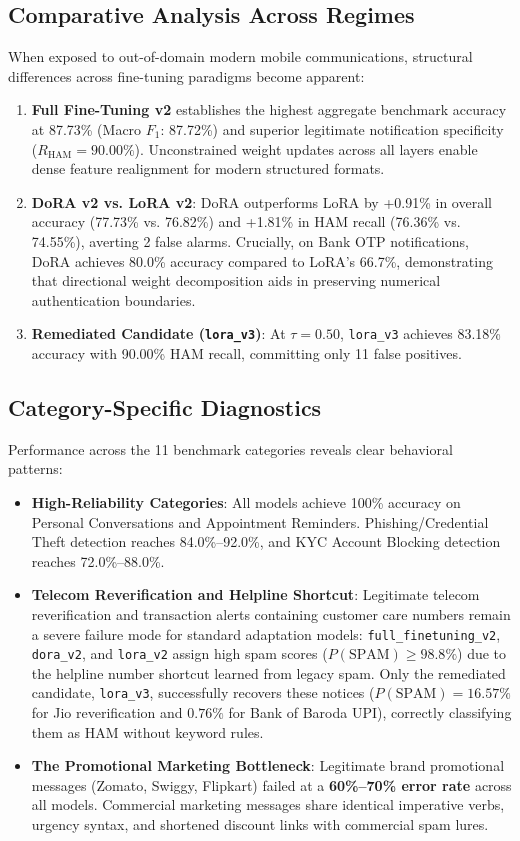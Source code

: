 \documentclass[conference]{IEEEtran}
\begin{document}
\subsection{Comparative Analysis Across Regimes}
When exposed to out-of-domain modern mobile communications, structural differences across fine-tuning paradigms become apparent:
\begin{enumerate}
    \item \textbf{Full Fine-Tuning v2} establishes the highest aggregate benchmark accuracy at 87.73\% (Macro $F_1$: 87.72\%) and superior legitimate notification specificity ($R_{\text{HAM}} = 90.00\%$). Unconstrained weight updates across all layers enable dense feature realignment for modern structured formats.
    \item \textbf{DoRA v2 vs. LoRA v2}: DoRA outperforms LoRA by +0.91\% in overall accuracy (77.73\% vs. 76.82\%) and +1.81\% in HAM recall (76.36\% vs. 74.55\%), averting 2 false alarms. Crucially, on Bank OTP notifications, DoRA achieves 80.0\% accuracy compared to LoRA's 66.7\%, demonstrating that directional weight decomposition aids in preserving numerical authentication boundaries.
    \item \textbf{Remediated Candidate (\texttt{lora\_v3})}: At $\tau = 0.50$, \texttt{lora\_v3} achieves 83.18\% accuracy with 90.00\% HAM recall, committing only 11 false positives.
\end{enumerate}

\subsection{Category-Specific Diagnostics}
Performance across the 11 benchmark categories reveals clear behavioral patterns:
\begin{itemize}
    \item \textbf{High-Reliability Categories}: All models achieve 100\% accuracy on Personal Conversations and Appointment Reminders. Phishing/Credential Theft detection reaches 84.0\%--92.0\%, and KYC Account Blocking detection reaches 72.0\%--88.0\%.
    \item \textbf{Telecom Reverification and Helpline Shortcut}: Legitimate telecom reverification and transaction alerts containing customer care numbers remain a severe failure mode for standard adaptation models: \texttt{full\_finetuning\_v2}, \texttt{dora\_v2}, and \texttt{lora\_v2} assign high spam scores ($P(\text{SPAM}) \ge 98.8\%$) due to the helpline number shortcut learned from legacy spam. Only the remediated candidate, \texttt{lora\_v3}, successfully recovers these notices ($P(\text{SPAM}) = 16.57\%$ for Jio reverification and $0.76\%$ for Bank of Baroda UPI), correctly classifying them as HAM without keyword rules.
    \item \textbf{The Promotional Marketing Bottleneck}: Legitimate brand promotional messages (Zomato, Swiggy, Flipkart) failed at a \textbf{60\%--70\% error rate} across all models. Commercial marketing messages share identical imperative verbs, urgency syntax, and shortened discount links with commercial spam lures.
\end{itemize}
\end{document}
